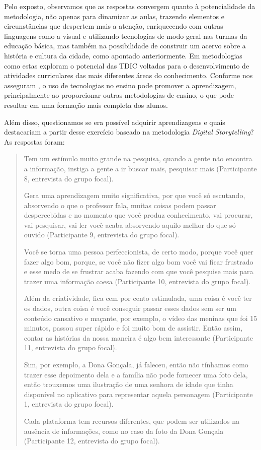 \documentclass[portuguese]{textolivre}
\begin{document}
Pelo exposto, observamos que as respostas convergem quanto à potencialidade da metodologia, não apenas para dinamizar as aulas, trazendo elementos e circunstâncias que despertem mais a atenção, enriquecendo com outras linguagens como a visual e utilizando tecnologias de modo geral nas turmas da educação básica, mas também na possibilidade de construir um acervo sobre a história e cultura da cidade, como apontado anteriormente. Em metodologias como estas exploram o potencial das TDIC voltadas para o desenvolvimento de atividades curriculares das mais diferentes áreas do conhecimento. Conforme nos asseguram \textcite{rodrigues2020narrativas,rodrigues2023para,prado2017narrativas}, o uso de tecnologias no ensino pode promover a aprendizagem, principalmente ao proporcionar outras metodologias de ensino, o que pode resultar em uma formação mais completa dos alunos.

Além disso, questionamos se era possível adquirir aprendizagens e quais destacariam a partir desse exercício baseado na metodologia \textit{Digital Storytelling}? As respostas foram:

\begin{quote}
    Tem um estímulo muito grande na pesquisa, quando a gente não encontra a informação, instiga a gente a ir buscar mais, pesquisar mais (Participante 8, entrevista do grupo focal).

    Gera uma aprendizagem muito significativa, por que você só escutando, absorvendo o que o professor fala, muitas coisas podem passar despercebidas e no momento que você produz conhecimento, vai procurar, vai pesquisar, vai ler você acaba absorvendo aquilo melhor do que só ouvido (Participante 9, entrevista do grupo focal).

    Você se torna uma pessoa perfeccionista, de certo modo, porque você quer fazer algo bom, porque, se você não fizer algo bom você vai ficar frustrado e esse medo de se frustrar acaba fazendo com que você pesquise mais para trazer uma informação coesa (Participante 10, entrevista do grupo focal).

    Além da criatividade, fica cem por cento estimulada, uma coisa é você ter os dados, outra coisa é você conseguir passar esses dados sem ser um conteúdo cansativo e maçante, por exemplo, o vídeo das meninas que foi 15 minutos, passou super rápido e foi muito bom de assistir. Então assim, contar as histórias da nossa maneira é algo bem interessante (Participante 11, entrevista do grupo focal).

    Sim, por exemplo, a Dona Gonçala, já faleceu, então não tínhamos como trazer esse depoimento dela e a família não pode fornecer uma foto dela, então trouxemos uma ilustração de uma senhora de idade que tinha disponível no aplicativo para representar aquela personagem (Participante 1, entrevista do grupo focal).

    Cada plataforma tem recursos diferentes, que podem ser utilizados na ausência de informações, como no caso da foto da Dona Gonçala (Participante 12, entrevista do grupo focal).
\end{quote}
\end{document}
